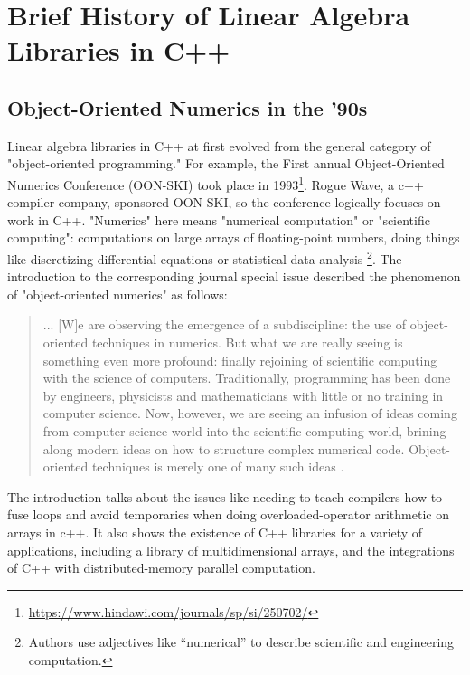 \chapter{Brief History of Linear Algebra Libraries in C++}


\section{Object-Oriented Numerics in the '90s}

Linear algebra libraries in C++ at first evolved from the general category of
"object-oriented programming." For example, the First annual Object-Oriented
Numerics Conference (OON-SKI) took place in 1993\footnote{\url{
https://www.hindawi.com/journals/sp/si/250702/}}. Rogue Wave, a c++
compiler company, sponsored OON-SKI, so the conference logically focuses on work
in C++. "Numerics" here means "numerical computation" or "scientific computing":
computations on large arrays of floating-point numbers, doing things like
discretizing differential equations or statistical data analysis \footnote{
Authors use adjectives like “numerical” to describe scientific and engineering
computation.}.  The introduction to the corresponding journal special issue
described the phenomenon of "object-oriented numerics" as follows:

\begin{quote}
  ... [W]e are observing the emergence of a subdiscipline: the use of
  object-oriented techniques in numerics. But what we are really seeing is
  something even more profound: finally rejoining of scientific computing with
  the science of computers. Traditionally, programming has been done by
  engineers, physicists and mathematicians with little or no training in
  computer science. Now, however, we are seeing an infusion of ideas coming from
  computer science world into the scientific computing world, brining along
  modern ideas on how to structure complex numerical code. Object-oriented
  techniques is merely one of many such ideas \cite{Vermeulen1993}.
\end{quote}

The introduction talks about the issues like needing to teach compilers how to
fuse loops and avoid temporaries when doing overloaded-operator arithmetic on
arrays in c++. It also shows the existence of C++ libraries for a variety of
applications, including a library of multidimensional arrays, and the
integrations of C++ with distributed-memory parallel computation.

